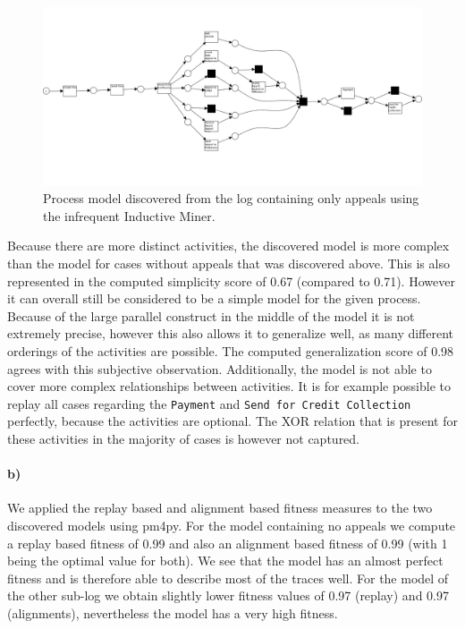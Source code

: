 \documentclass[12pt]{report}
\begin{document}
\begin{figure}[H]
  \centering
  \includegraphics[width=\textwidth]{figures/im_appeals.png}
  \caption{Process model discovered from the log containing only appeals using the infrequent Inductive Miner.}
  \label{fig:im_appeals}
\end{figure}
Because there are more distinct activities, the discovered model is more complex than the model for cases without appeals that was discovered above. This is also represented in the computed simplicity score of 0.67 (compared to 0.71). However it can overall still be considered to be a simple model for the given process. Because of the large parallel construct in the middle of the model it is not extremely precise, however this also allows it to generalize well, as many different orderings of the activities are possible. The computed generalization score of 0.98 agrees with this subjective observation. Additionally, the model is not able to cover more complex relationships between activities. It is for example possible to replay all cases regarding the \texttt{Payment} and \texttt{Send for Credit Collection} perfectly, because the activities are optional. The XOR relation that is present for these activities in the majority of cases is however not captured.

\paragraph{\textbf{b)}}
We applied the replay based and alignment based fitness measures to the two discovered models using pm4py. For the model containing no appeals we compute a replay based fitness of 0.99 and also an alignment based fitness of 0.99 (with 1 being the optimal value for both). We see that the model has an almost perfect fitness and is therefore able to describe most of the traces well. For the model of the other sub-log we obtain slightly lower fitness values of 0.97 (replay) and 0.97 (alignments), nevertheless the model has a very high fitness.
\end{document}
